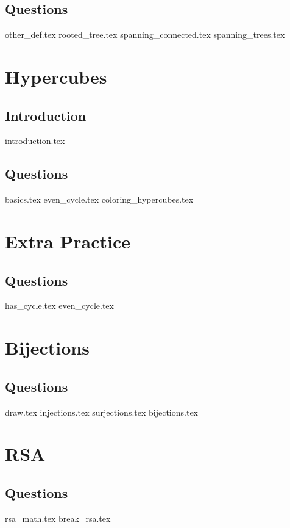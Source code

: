 \documentclass{exam}
\begin{document}
\subsection{Questions}
\begin{questions}
{other_def.tex}
{rooted_tree.tex}
{spanning_connected.tex}
{spanning_trees.tex}
\end{questions}

\section{Hypercubes}
\subsection{Introduction}
{introduction.tex}
\subsection{Questions}
\begin{questions}
{basics.tex}
{even_cycle.tex}
{coloring_hypercubes.tex}
\end{questions}

\section{Extra Practice}
\subsection{Questions}
\begin{questions}
{has_cycle.tex}
{even_cycle.tex}
\end{questions}

\section{Bijections}
\subsection{Questions}
\begin{questions}
{draw.tex}
{injections.tex}
{surjections.tex}
{bijections.tex}
\end{questions}

\section{RSA}
\subsection{Questions}
\begin{questions}
{rsa_math.tex}
{break_rsa.tex}
\end{questions}
\end{document}
